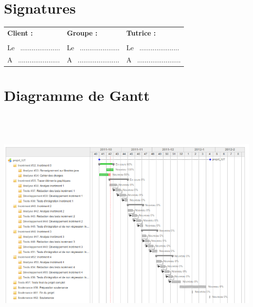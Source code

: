 \documentclass[12pt,a4paper,openany]{article}
\begin{document}

\section*{Signatures}
\vspace{20px}
\begin{tabular}[center]{p{175px}p{175px}p{175px}}
  \textbf{Client :} & \textbf{Groupe :} & \textbf{Tutrice :} \\
  \\
  Le ~..................... & Le ~..................... & Le ~..................... \\
  A ~...................... & A ~...................... & A ~....................... \\
\end{tabular}
\newpage
\appendix
\section{Diagramme de Gantt}
\label{gantt}
\hspace{20px}
\vspace{-330px}
\includegraphics[height=450px, angle=-90]{projetiut-gantt.png}
\newpage
\end{document}

